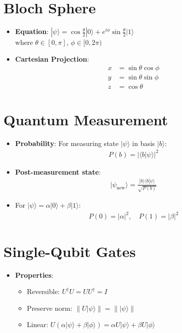 \begin{multicols}{3}
\section*{Bloch Sphere}
\begin{itemize}[leftmargin=*,nosep,topsep=0pt]
    \item \textbf{Equation}: $|\psi\rangle = \cos\frac{\theta}{2}|0\rangle + e^{i\phi}\sin\frac{\theta}{2}|1\rangle$\\
    where $\theta \in [0,\pi]$, $\phi \in [0,2\pi)$
    \item \textbf{Cartesian Projection}:
    \begin{align*}
        x &= \sin\theta\cos\phi\\
        y &= \sin\theta\sin\phi\\
        z &= \cos\theta
    \end{align*}
\end{itemize}

\section*{Quantum Measurement}
\begin{itemize}[leftmargin=*,nosep,topsep=0pt]
    \item \textbf{Probability}: For measuring state $|\psi\rangle$ in basis $|b\rangle$:
    \begin{align*}
        P(b) = |\langle b|\psi\rangle|^2
    \end{align*}
    \item \textbf{Post-measurement state}:
    \begin{align*}
        |\psi_{\text{new}}\rangle = \frac{|b\rangle\langle b|\psi\rangle}{\sqrt{P(b)}}
    \end{align*}
    \item For $|\psi\rangle = \alpha|0\rangle + \beta|1\rangle$:
    \begin{align*}
        P(0) = |\alpha|^2, \quad P(1) = |\beta|^2
    \end{align*}
\end{itemize}

\section*{Single-Qubit Gates}
\begin{itemize}[leftmargin=*,nosep,topsep=0pt]
    \item \textbf{Properties}:
    \begin{itemize}[nosep]
        \item Reversible: $U^\dagger U = UU^\dagger = I$
        \item Preserve norm: $\|U|\psi\rangle\| = \||\psi\rangle\|$
        \item Linear: $U(\alpha|\psi\rangle + \beta|\phi\rangle) = \alpha U|\psi\rangle + \beta U|\phi\rangle$
    \end{itemize}
\end{itemize}


\end{multicols}
